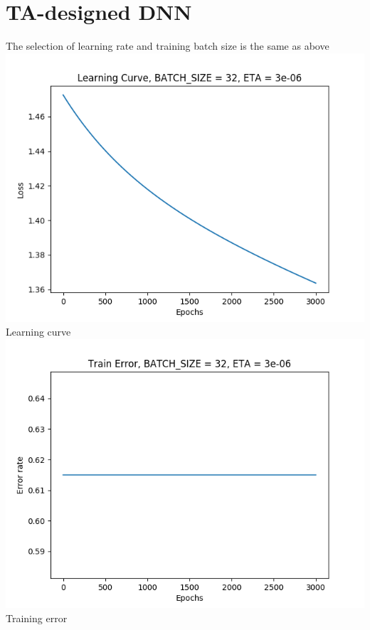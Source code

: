 \documentclass[11pt, a4paper]{article} %
\begin{document}
\section{TA-designed DNN}
The selection of learning rate and training batch size is the same as above
\\
\includegraphics[scale = 0.6]{figure_2/LC.png} %
\\
Learning curve
\\

\includegraphics[scale = 0.6]{figure_2/TRE.png} %
\\
Training error
\\
\end{document}
